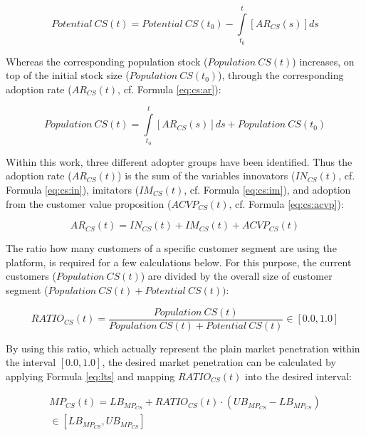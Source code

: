 \begin{equation}\label{eq:cs:pot}
	\mathit{Potential~CS(t)} =\mathit{Potential~CS(t_0)} - \int\limits_{t_0}^t  [AR_{CS}(s)]ds
\end{equation}

Whereas the corresponding population stock ($\mathit{Population~CS(t)}$) \linebreak increases, on top of the initial stock size ($\mathit{Population~CS(t_0)}$), through the corresponding adoption rate ($AR_{CS}(t)$, cf. Formula \ref{eq:cs:ar}):

\begin{equation}\label{eq:cs:pop}
	\mathit{Population~CS(t)} = \int\limits_{t_0}^t [AR_{CS}(s)]ds + \mathit{Population~CS(t_0)}
\end{equation}

Within this work, three different adopter groups have been identified. Thus the adoption rate ($AR_{CS}(t)$) is the sum of the variables innovators ($IN_{CS}(t)$, cf. Formula \ref{eq:cs:in}), imitators ($IM_{CS}(t)$, cf. Formula \ref{eq:cs:im}), and adoption from the customer value proposition ($ACVP_{CS}(t)$, cf. Formula \ref{eq:cs:acvp}):

\begin{equation}\label{eq:cs:ar}
		AR_{CS}(t) = IN_{CS}(t) + IM_{CS}(t) + ACVP_{CS}(t)	
\end{equation}

The ratio how many customers of a specific customer segment are using the platform, is required for a few calculations below. For this purpose, the current customers ($\mathit{Population~CS(t)}$) are divided by the overall size of customer segment ($\mathit{Population~CS(t)} + \mathit{Potential~CS(t)})$:

\begin{equation}\label{eq:cs:ratio}
		RATIO_{CS}(t) = \frac{\mathit{Population~CS(t)}}{\mathit{Population~CS(t)} + \mathit{Potential~CS(t)}} \in [0.0,1.0]
\end{equation}

By using this ratio, which actually represent the plain market penetration within the interval $[0.0,1.0]$, the desired market penetration can be calculated by applying Formula \ref{eq:lts} and mapping $RATIO_{CS}(t)$ into the desired interval:

\begin{eqnarray}\label{eq:cs:mp}
	MP_{CS}(t) = LB_{MP_{CS}} + RATIO_{CS}(t) \cdot (UB_{MP_{CS}} - LB_{MP_{CS}})  \nonumber \\ \in [LB_{MP_{CS}},UB_{MP_{CS}}]
\end{eqnarray}

